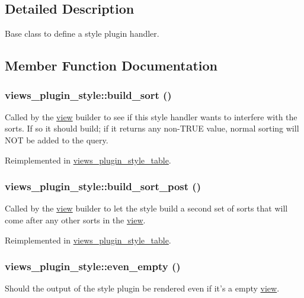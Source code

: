 \subsection{Detailed Description}
Base class to define a style plugin handler. 

\subsection{Member Function Documentation}
\hypertarget{classviews__plugin__style_a13b4b43f813fde038a199d2ec26fc76e}{
\subsubsection[{build\_\-sort}]{\setlength{\rightskip}{0pt plus 5cm}views\_\-plugin\_\-style::build\_\-sort ()}}
\label{classviews__plugin__style_a13b4b43f813fde038a199d2ec26fc76e}
Called by the \hyperlink{classview}{view} builder to see if this style handler wants to interfere with the sorts. If so it should build; if it returns any non-\/TRUE value, normal sorting will NOT be added to the query. 

Reimplemented in \hyperlink{classviews__plugin__style__table_a3bc31ba52d980f899307aee2d74bef58}{views\_\-plugin\_\-style\_\-table}.\hypertarget{classviews__plugin__style_af59de962f895ccd0b3adf960b908e0bd}{
\subsubsection[{build\_\-sort\_\-post}]{\setlength{\rightskip}{0pt plus 5cm}views\_\-plugin\_\-style::build\_\-sort\_\-post ()}}
\label{classviews__plugin__style_af59de962f895ccd0b3adf960b908e0bd}
Called by the \hyperlink{classview}{view} builder to let the style build a second set of sorts that will come after any other sorts in the \hyperlink{classview}{view}. 

Reimplemented in \hyperlink{classviews__plugin__style__table_a00d9e14ac7f545d47a43af3f9d186382}{views\_\-plugin\_\-style\_\-table}.\hypertarget{classviews__plugin__style_af9009e2a5f50ea90d9f02adeba4b711c}{
\subsubsection[{even\_\-empty}]{\setlength{\rightskip}{0pt plus 5cm}views\_\-plugin\_\-style::even\_\-empty ()}}
\label{classviews__plugin__style_af9009e2a5f50ea90d9f02adeba4b711c}
Should the output of the style plugin be rendered even if it's a empty \hyperlink{classview}{view}. 

